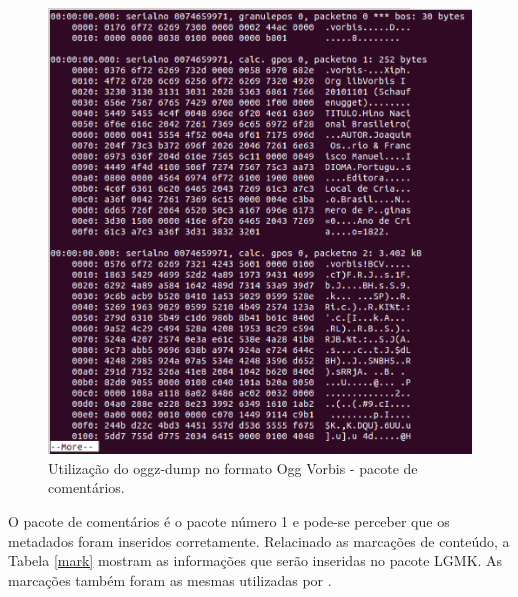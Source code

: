  \begin{figure}[ht]
	\centering
		\includegraphics[keepaspectratio=true,scale=0.3]{figuras/hnbogg.eps}
	\caption{Utilização do oggz-dump no formato Ogg Vorbis - pacote de comentários.}
	\label{meta}
\end{figure}

O pacote de comentários é o pacote número 1 e pode-se perceber que os metadados foram inseridos corretamente. Relacinado as marcações de conteúdo,  a Tabela \ref{mark} mostram as informações que serão inseridas no pacote LGMK. As marcações também foram as mesmas utilizadas por \cite{herbert}.

